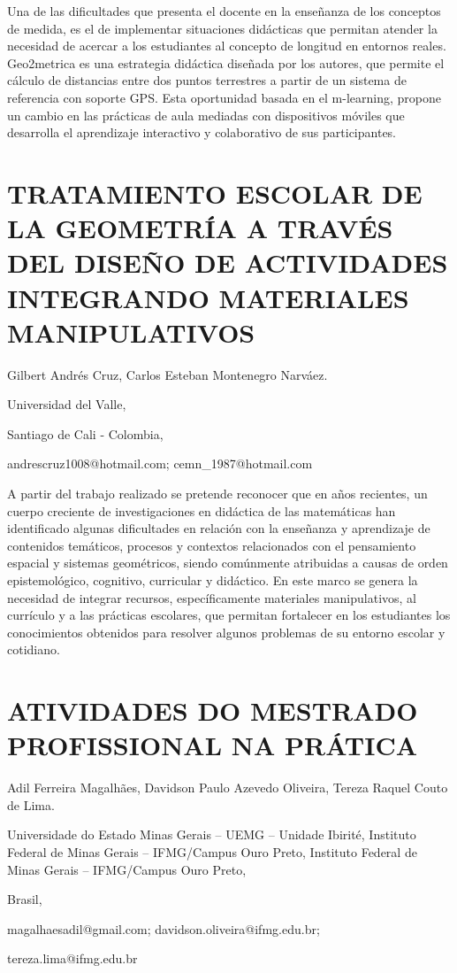 Una de las dificultades que presenta el docente en la enseñanza de
los conceptos de medida, es el de implementar situaciones didácticas
que permitan atender la necesidad de acercar a los estudiantes al
concepto de longitud en entornos reales. Geo2metrica es una estrategia
didáctica diseñada por los autores, que permite el cálculo de distancias
entre dos puntos terrestres a partir de un sistema de referencia con
soporte GPS. Esta oportunidad basada en el m-learning, propone un
cambio en las prácticas de aula mediadas con dispositivos móviles
que desarrolla el aprendizaje interactivo y colaborativo de sus participantes. 


\section{TRATAMIENTO ESCOLAR DE LA GEOMETRÍA A TRAVÉS DEL DISEÑO DE ACTIVIDADES
INTEGRANDO MATERIALES MANIPULATIVOS }

\begin{datos}

Gilbert Andrés Cruz, Carlos Esteban Montenegro Narváez.

Universidad del Valle,

Santiago de Cali - Colombia,

andrescruz1008@hotmail.com; cemn\_1987@hotmail.com

\end{datos}

A partir del trabajo realizado se pretende reconocer que en años recientes,
un cuerpo creciente de investigaciones en didáctica de las matemáticas
han identificado algunas dificultades en relación con la enseñanza
y aprendizaje de contenidos temáticos, procesos y contextos relacionados
con el pensamiento espacial y sistemas geométricos, siendo comúnmente
atribuidas a causas de orden epistemológico, cognitivo, curricular
y didáctico. En este marco se genera la necesidad de integrar recursos,
específicamente materiales manipulativos, al currículo y a las prácticas
escolares, que permitan fortalecer en los estudiantes los conocimientos
obtenidos para resolver algunos problemas de su entorno escolar y
cotidiano.


\section{ATIVIDADES DO MESTRADO PROFISSIONAL NA PRÁTICA}

\begin{datos}

Adil Ferreira Magalhães, Davidson Paulo Azevedo Oliveira, Tereza Raquel
Couto de Lima.

Universidade do Estado Minas Gerais – UEMG – Unidade Ibirité, Instituto
Federal de Minas Gerais – IFMG/Campus Ouro Preto, Instituto Federal
de Minas Gerais – IFMG/Campus Ouro Preto,

Brasil,

magalhaesadil@gmail.com; davidson.oliveira@ifmg.edu.br;

tereza.lima@ifmg.edu.br

\end{datos}

